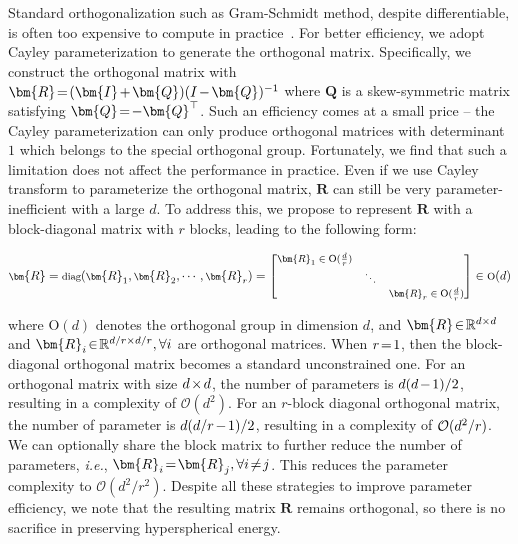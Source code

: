 Standard orthogonalization such as Gram-Schmidt method, despite differentiable, is often too expensive to compute in practice~\cite{liu2021orthogonal}. For better efficiency, we adopt Cayley parameterization to generate the orthogonal matrix. Specifically, we construct the orthogonal matrix with $\thickmuskip=2mu \medmuskip=2mu \bm{R}=(\bm{I}+\bm{Q})(I-\bm{Q})^{-1}$ where $\bm{Q}$ is a skew-symmetric matrix satisfying $\thickmuskip=2mu \medmuskip=2mu \bm{Q}=-\bm{Q}^\top$. Such an efficiency comes at a small price -- the Cayley parameterization can only produce orthogonal matrices with determinant $1$ which belongs to the special orthogonal group. Fortunately, we find that such a limitation does not affect the performance in practice. Even if we use Cayley transform to parameterize the orthogonal matrix, $\bm{R}$ can still be very parameter-inefficient with a large $d$. To address this, we propose to represent $\bm{R}$ with a block-diagonal matrix with $r$ blocks, leading to the following form:

\begin{equation}
    \footnotesize
    \bm{R}=\text{diag}(\bm{R}_1,\bm{R}_2,\cdots,\bm{R}_r)=\begin{bmatrix}
    \bm{R}_1\in \text{O}(\frac{d}{r}) &  &\\
    &\ddots & \\
    & & \bm{R}_r\in \text{O}(\frac{d}{r})
    \end{bmatrix}\in \text{O}(d)
\end{equation}

where $\text{O}(d)$ denotes the orthogonal group in dimension $d$, and $\thickmuskip=2mu \medmuskip=2mu \bm{R}\in\mathbb{R}^{d\times d}$ and $\thickmuskip=2mu \medmuskip=2mu \bm{R}_i\in\mathbb{R}^{d/r\times d/r},\forall i$ are orthogonal matrices. When $\thickmuskip=2mu \medmuskip=2mu r=1$, then the block-diagonal orthogonal matrix becomes a standard unconstrained one. For an orthogonal matrix with size $\thickmuskip=2mu \medmuskip=2mu d\times d$, the number of parameters is $\thickmuskip=2mu \medmuskip=2mu d(d-1)/2$, resulting in a complexity of $\mathcal{O}(d^2)$. For an $r$-block diagonal orthogonal matrix, the number of parameter is $\thickmuskip=2mu \medmuskip=2mu d(d/r-1)/2$, resulting in a complexity of $\thickmuskip=2mu \medmuskip=2mu \mathcal{O}(d^2/r)$. We can optionally share the block matrix to further reduce the number of parameters, \emph{i.e.}, $\thickmuskip=2mu \medmuskip=2mu\bm{R}_i=\bm{R}_j,\forall i\neq j$. This reduces the parameter complexity to $\mathcal{O}(d^2/r^2)$.  Despite all these strategies to improve parameter efficiency, we note that the resulting matrix $\bm{R}$ remains orthogonal, so there is no sacrifice in preserving hyperspherical energy.

